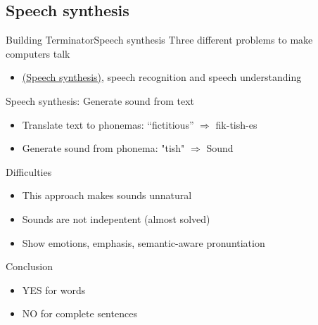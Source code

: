 \documentclass[10pt,compress]{beamer} %
\begin{document}
\subsection{Speech synthesis}
\begin{frame}{Building Terminator}{Speech synthesis}
	Three different problems to make computers talk
	\begin{itemize}
		\item \href{https://youtu.be/SYJCWStejSc?t=65}{(Speech synthesis)}, speech recognition and speech understanding
	\end{itemize}
	Speech synthesis: Generate sound from text
	\begin{itemize}
		\item Translate text to phonemas: “fictitious”  $\Rightarrow$ fik-tish-es
		\item Generate sound from phonema: "tish" $\Rightarrow$ Sound
	\end{itemize}
	Difficulties
	\begin{itemize}
		\item This approach makes sounds unnatural
		\item Sounds are not indepentent (almost solved)
		\item Show emotions, emphasis, semantic-aware pronuntiation
	\end{itemize}
	Conclusion
	\begin{itemize}
		\item YES for words
		\item NO for complete sentences
	\end{itemize}
\end{frame}
\end{document}
